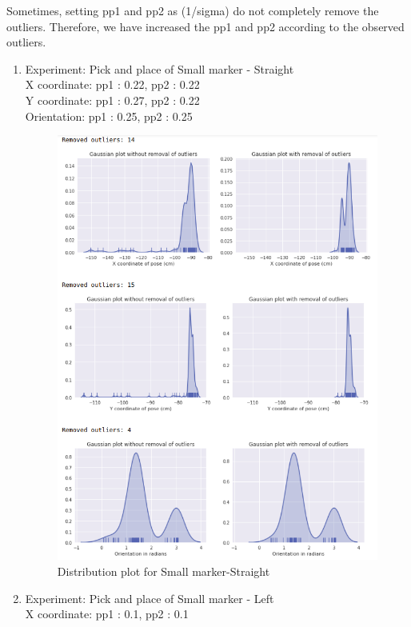 \documentclass[11pt,a4paper]{article}
\begin{document}
				Sometimes, setting pp1 and pp2 as (1/sigma) do not completely remove the outliers. Therefore, we have increased the pp1 and pp2 according to the observed outliers.
				\newpage
				\begin{enumerate}
				\item Experiment: Pick and place of Small marker - Straight\\
				X coordinate: pp1 : 0.22, pp2 : 0.22\\
				Y coordinate: pp1 : 0.27, pp2 : 0.22 \\
				Orientation: pp1 : 0.25, pp2 : 0.25
				\begin{figure}[H]
					\centering
					\includegraphics[scale=0.56]{small-str}	
					\caption{Distribution plot for Small marker-Straight}
				\end{figure}
				\newpage
				\item Experiment: Pick and place of Small marker - Left\\
				X coordinate: pp1 : 0.1, pp2 : 0.1\\

\end{enumerate}
\end{document}
